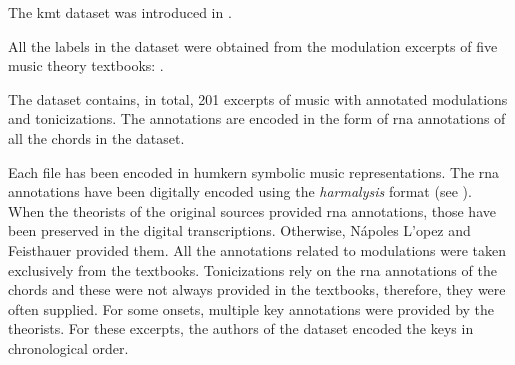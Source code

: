 
The \gls{kmt} dataset was introduced in
\textcite{napoleslopez2020local}.

All the labels in the dataset were obtained from the
modulation excerpts of five music theory textbooks:
\textcite{aldwell2019harmony, kostka2008tonal,
reger1904supplement, rimskikorsakov1886practical,
tchaikovsky1872guide}.

The dataset contains, in total, 201 excerpts of music with
annotated modulations and tonicizations. The annotations are
encoded in the form of \gls{rna} annotations of all the
chords in the dataset. 

Each file has been encoded in \gls{humkern} symbolic music
representations. The \gls{rna} annotations have been
digitally encoded using the \emph{harmalysis} format (see
). When the theorists of the
original sources provided \gls{rna} annotations, those have
been preserved in the digital transcriptions. Otherwise,
N\'apoles L'opez and Feisthauer provided them. All the
annotations related to modulations were taken exclusively
from the textbooks. Tonicizations rely on the \gls{rna}
annotations of the chords and these were not always provided
in the textbooks, therefore, they were often supplied. For
some onsets, multiple key annotations were provided by the
theorists. For these excerpts, the authors of the dataset
encoded the keys in chronological order.
